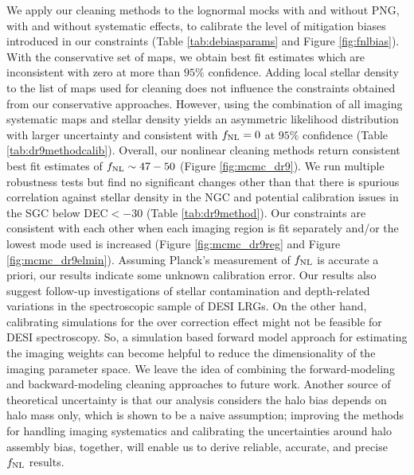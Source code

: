 We apply our cleaning methods to the lognormal mocks with and without PNG, with and without systematic effects, to calibrate the level of mitigation biases introduced in our constraints (Table \ref{tab:debiasparams} and Figure \ref{fig:fnlbias}). With the conservative set of maps, we obtain best fit estimates which are inconsistent with zero at more than $95\%$ confidence. Adding local stellar density to the list of maps used for cleaning does not influence the constraints obtained from our conservative approaches. However, using the combination of all imaging systematic maps and stellar density yields an asymmetric likelihood distribution with larger uncertainty and consistent with $f_{\rm NL}=0$ at $95\%$ confidence (Table \ref{tab:dr9methodcalib}).  Overall, our nonlinear cleaning methods return consistent best fit estimates of $f_{\rm NL} \sim 47-50$ (Figure \ref{fig:mcmc_dr9}). We run multiple robustness tests but find no significant changes other than that there is spurious correlation against stellar density in the NGC and potential calibration issues in the SGC below DEC$< -30$ (Table \ref{tab:dr9method}). Our constraints are consistent with each other when each imaging region is fit separately and/or the lowest mode used is increased (Figure \ref{fig:mcmc_dr9reg} and Figure \ref{fig:mcmc_dr9elmin}). Assuming Planck's measurement of $f_{\rm NL}$ is accurate a priori, our results indicate some unknown calibration error. Our results also suggest follow-up investigations of stellar contamination and depth-related variations in the spectroscopic sample of DESI LRGs.  On the other hand, calibrating simulations for the over correction effect might not be feasible for DESI spectroscopy. So, a simulation based forward model approach for estimating the imaging weights can become helpful to reduce the dimensionality of the imaging parameter space. We leave the idea of combining the forward-modeling and backward-modeling cleaning approaches to future work. Another source of theoretical uncertainty is that our analysis considers the halo bias depends on halo mass only, which is shown to be a naive assumption; improving the methods for handling imaging systematics and calibrating the uncertainties around halo assembly bias, together, will enable us to derive reliable, accurate, and precise $f_{\rm NL}$ results.